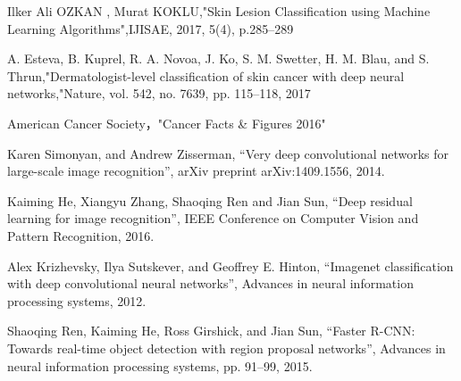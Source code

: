 \label{chap:bibliography}

\begin{thebibliography}{99}  %

Ilker Ali OZKAN , Murat KOKLU,"Skin Lesion Classification using Machine Learning Algorithms",IJISAE, 2017, 5(4), p.285–289 

A. Esteva, B. Kuprel, R. A. Novoa, J. Ko, S. M. Swetter, H. M. Blau,
and S. Thrun,"Dermatologist-level classification of skin cancer with
deep neural networks,"Nature, vol. 542, no. 7639, pp. 115–118, 2017

American Cancer Society，"Cancer Facts \& Figures 2016"

	Karen Simonyan, and Andrew Zisserman,
	 “Very deep convolutional networks for large-scale image recognition”, 
	arXiv preprint arXiv:1409.1556, 2014.
    
	Kaiming He, Xiangyu Zhang, Shaoqing Ren and Jian Sun,
	“Deep residual learning for image recognition”,
	 IEEE Conference on Computer Vision and Pattern Recognition, 2016.

	 Alex Krizhevsky, Ilya Sutskever, and Geoffrey E. Hinton,
 	“Imagenet classification with deep convolutional neural networks”,
	Advances in neural information processing systems, 2012.

	Shaoqing Ren, Kaiming He, Ross Girshick, and Jian Sun,
	“Faster R-CNN: Towards real-time object detection with region proposal networks”, 
	Advances in neural information processing systems, pp. 91–99, 2015.




\end{thebibliography}